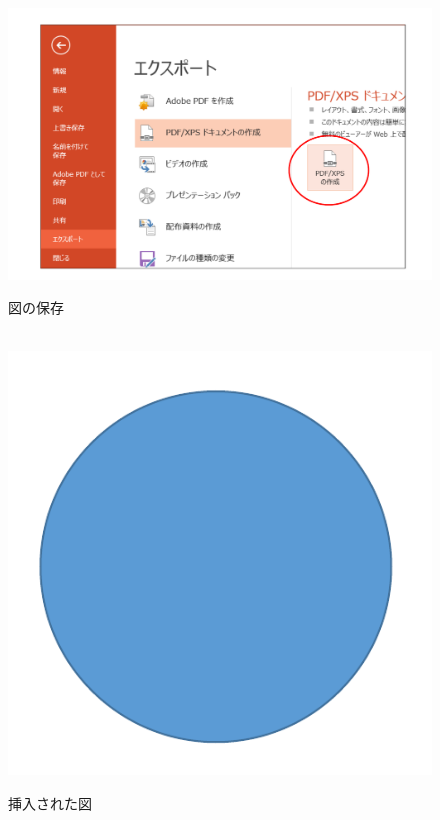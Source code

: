 \documentclass[twocolumn,a4j]{jarticle}
\begin{document}
\begin{figure}[t]
　\centering 
  \includegraphics[scale=0.25]{fig/save_pdf.pdf}
  \caption{図の保存}
  \label{fig:save_fig}
\end{figure}

\begin{figure}[t]
　\centering 
  \includegraphics[scale=0.25]{fig/fig.pdf}
  \caption{挿入された図}
  \label{fig:circle}
\end{figure}
\end{document}
